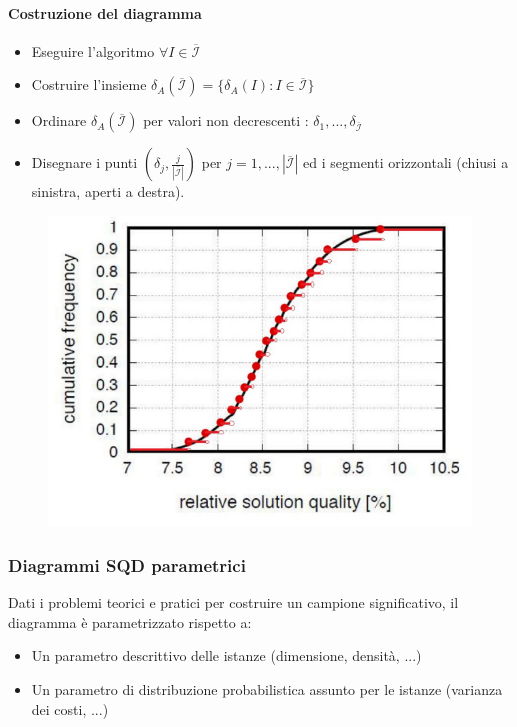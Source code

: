 \documentclass{article}
\newcommand{\ovcal}[1]{\overline{\mathcal{#1}}}
\begin{document}
\paragraph{Costruzione del diagramma}
\begin{itemize}
    \item Eseguire l'algoritmo $\forall I\in\overline{\mathcal{I}}$
    \item Costruire l'insieme $\delta_A(\ovcal{I})=\{\delta_A(I):I\in\ovcal{I}\}$
    \item Ordinare $\delta_A(\ovcal{I})$ per valori non decrescenti : $\delta_1,...,\delta_{\ovcal{I}}$
    \item Disegnare i punti $\left(\delta_j,\frac{j}{|\ovcal{I}|}\right)$ per $j=1,...,|\ovcal{I}|$ ed
          i segmenti orizzontali (chiusi a sinistra, aperti a destra).
\end{itemize}

\begin{figure}[H]
    \centering
    \includegraphics[scale=0.45]{images/SQD_1.png}
\end{figure}

\subsubsection{Diagrammi SQD parametrici}
Dati i problemi teorici e pratici per costruire un campione significativo, il diagramma è parametrizzato
rispetto a:
\begin{itemize}
    \item Un parametro descrittivo delle istanze (dimensione, densità, ...)
    \item Un parametro di distribuzione probabilistica assunto per le istanze (varianza dei costi, ...)
\end{itemize}
\end{document}
